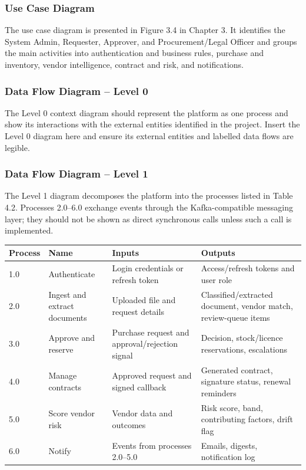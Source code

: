 \documentclass[12pt,a4paper]{report}
\begin{document}
\subsubsection{Use Case Diagram}

The use case diagram is presented in Figure 3.4 in Chapter 3. It
identifies the System Admin, Requester, Approver, and Procurement/Legal
Officer and groups the main activities into authentication and business
rules, purchase and inventory, vendor intelligence, contract and risk,
and notifications.

\subsubsection{Data Flow Diagram -- Level 0}

The Level 0 context diagram should represent the platform as one
process and show its interactions with the external entities identified
in the project. Insert the Level 0 diagram here and ensure its external
entities and labelled data flows are legible.

\subsubsection{Data Flow Diagram -- Level 1}

The Level 1 diagram decomposes the platform into the processes listed
in Table 4.2. Processes 2.0--6.0 exchange events through the
Kafka-compatible messaging layer; they should not be shown as direct
synchronous calls unless such a call is implemented.

\begin{longtable}{|p{0.65in}|p{1.4in}|p{2in}|p{2.3in}|}
\hline
\textbf{Process} & \textbf{Name} & \textbf{Inputs} & \textbf{Outputs} \\
\hline
1.0 & Authenticate & Login credentials or refresh token &
Access/refresh tokens and user role \\
\hline
2.0 & Ingest and extract documents & Uploaded file and request details &
Classified/extracted document, vendor match, review-queue items \\
\hline
3.0 & Approve and reserve & Purchase request and approval/rejection
signal & Decision, stock/licence reservations, escalations \\
\hline
4.0 & Manage contracts & Approved request and signed callback &
Generated contract, signature status, renewal reminders \\
\hline
5.0 & Score vendor risk & Vendor data and outcomes &
Risk score, band, contributing factors, drift flag \\
\hline
6.0 & Notify & Events from processes 2.0--5.0 &
Emails, digests, notification log \\
\hline
\end{longtable}
\end{document}
